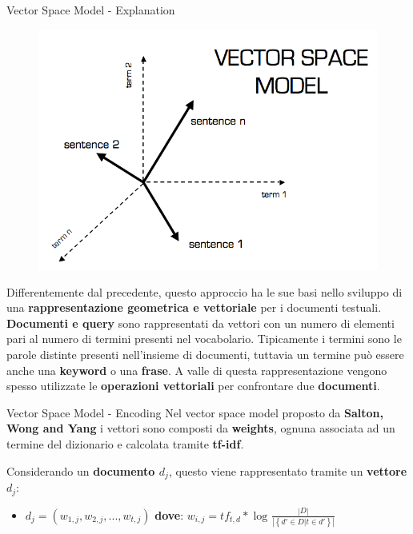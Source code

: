 \documentclass[british]{beamer}
\begin{document}
\begin{frame}{Vector Space Model - Explanation}
	\begin{figure}
		\includegraphics[width=1.1\linewidth,height=0.4\textwidth]{./Imgs/vector_space.png}
	\end{figure}	
	Differentemente dal precedente, questo approccio ha le sue basi nello sviluppo di una \textbf{rappresentazione geometrica e vettoriale} per i documenti testuali.
	\textbf{Documenti e query} sono rappresentati da vettori con un numero di elementi pari al numero di termini presenti nel vocabolario.
	Tipicamente i termini sono le parole distinte presenti nell'insieme di documenti, tuttavia un termine pu\`{o} essere anche una \textbf{keyword} o una \textbf{frase}.
	A valle di questa rappresentazione vengono spesso utilizzate le \textbf{operazioni vettoriali} per confrontare due \textbf{documenti}.
\end{frame}

\begin{frame}{Vector Space Model - Encoding}
	Nel vector space model proposto da \textbf{Salton, Wong and Yang} i vettori sono composti da \textbf{weights}, ognuna associata ad un termine del dizionario e calcolata tramite \textbf{tf-idf}.\par
	Considerando un \textbf{documento \(d_j\)}, questo viene rappresentato tramite un \textbf{vettore \(d_j\)}: \par
	\begin{itemize}
		\item \(d_j = (w_{1,j}, w_{2,j}, ..., w_{t,j})\) \textbf{dove}:
		\(w_{i,j} = tf_{t,d} * \log_{}{\frac{|D|}{|\left \{d' \in D | t \in d'\right \}|}}\)
	\end{itemize}
	
\end{frame}
\end{document}
